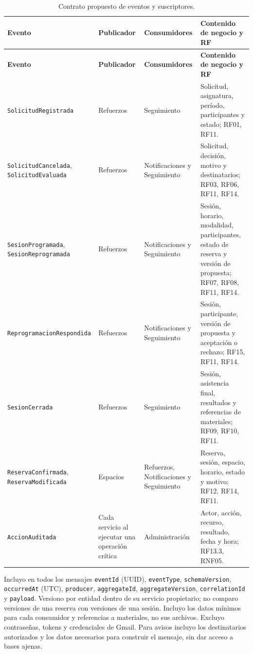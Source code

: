 \small
\begin{longtable}{@{}p{.29\linewidth}p{.13\linewidth}p{.23\linewidth}p{.25\linewidth}@{}}
\caption{Contrato propuesto de eventos y suscriptores.}
\label{tab:eventos-roger}\\
\toprule
\textbf{Evento} & \textbf{Publicador} & \textbf{Consumidores} & \textbf{Contenido de negocio y RF}\\
\midrule\endfirsthead
\toprule
\textbf{Evento} & \textbf{Publicador} & \textbf{Consumidores} & \textbf{Contenido de negocio y RF}\\
\midrule\endhead
\bottomrule\endlastfoot
\texttt{SolicitudRegistrada} &
Refuerzos & Seguimiento &
Solicitud, asignatura, período, participantes y estado; RF01, RF11.\\
\midrule
\texttt{SolicitudCancelada}, \texttt{SolicitudEvaluada} &
Refuerzos & Notificaciones y Seguimiento &
Solicitud, decisión, motivo y destinatarios; RF03, RF06, RF11, RF14.\\
\midrule
\texttt{SesionProgramada}, \texttt{SesionReprogramada} &
Refuerzos & Notificaciones y Seguimiento &
Sesión, horario, modalidad, participantes, estado de reserva y versión de propuesta; RF07, RF08, RF11, RF14.\\
\midrule
\texttt{ReprogramacionRespondida} &
Refuerzos & Notificaciones y Seguimiento &
Sesión, participante, versión de propuesta y aceptación o rechazo; RF15, RF11, RF14.\\
\midrule
\texttt{SesionCerrada} &
Refuerzos & Seguimiento &
Sesión, asistencia final, resultados y referencias de materiales; RF09, RF10, RF11.\\
\midrule
\texttt{ReservaConfirmada}, \texttt{ReservaModificada} &
Espacios & Refuerzos, Notificaciones y Seguimiento &
Reserva, sesión, espacio, horario, estado y motivo; RF12, RF14, RF11.\\
\midrule
\texttt{AccionAuditada} &
Cada servicio al ejecutar una operación crítica &
Administración &
Actor, acción, recurso, resultado, fecha y hora; RF13.3, RNF05.\\
\end{longtable}
\normalsize

Incluyo en todos los mensajes \texttt{eventId} (UUID), \texttt{eventType},
\texttt{schemaVersion}, \texttt{occurredAt} (UTC),
\texttt{producer}, \texttt{aggregateId}, \texttt{aggregateVersion},
\texttt{correlationId} y \texttt{payload}.
Versiono por entidad dentro de su servicio propietario; no comparo
versiones de una reserva con versiones de una sesión.
Incluyo los datos mínimos para cada consumidor y referencias a materiales,
no sus archivos. Excluyo contraseñas, tokens y credenciales de Gmail.
Para avisos incluyo los destinatarios autorizados y los datos necesarios
para construir el mensaje, sin dar acceso a bases ajenas.

